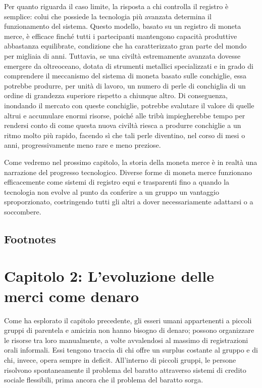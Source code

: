 \documentclass[
  a5paper,
  smalldemyvopaper,10pt,twoside,onecolumn,openright,extrafontsizes,hidelinks]{memoir}
\begin{document}
Per quanto riguarda il caso limite, la risposta a chi controlla il
registro è semplice: colui che possiede la tecnologia più avanzata
determina il funzionamento del sistema. Questo modello, basato su un
registro di moneta merce, è efficace finché tutti i partecipanti
mantengono capacità produttive abbastanza equilibrate, condizione che ha
caratterizzato gran parte del mondo per migliaia di anni. Tuttavia, se
una civiltà estremamente avanzata dovesse emergere da oltreoceano,
dotata di strumenti metallici specializzati e in grado di comprendere il
meccanismo del sistema di moneta basato sulle conchiglie, essa potrebbe
produrre, per unità di lavoro, un numero di perle di conchiglia di un
ordine di grandezza superiore rispetto a chiunque altro. Di conseguenza,
inondando il mercato con queste conchiglie, potrebbe svalutare il valore
di quelle altrui e accumulare enormi risorse, poiché alle tribù
impiegherebbe tempo per rendersi conto di come questa nuova civiltà
riesca a produrre conchiglie a un ritmo molto più rapido, facendo sì che
tali perle diventino, nel corso di mesi o anni, progressivamente meno
rare e meno preziose.

Come vedremo nel prossimo capitolo, la storia della moneta merce è in
realtà una narrazione del progresso tecnologico. Diverse forme di moneta
merce funzionano efficacemente come sistemi di registro equi e
trasparenti fino a quando la tecnologia non evolve al punto da conferire
a un gruppo un vantaggio sproporzionato, costringendo tutti gli altri a
dover necessariamente adattarsi o a soccombere.

\section{Footnotes}\label{footnotes}


\chapter{\texorpdfstring{Capitolo 2: \textbf{L'evoluzione delle merci
come
denaro}}{Capitolo 2: L'evoluzione delle merci come denaro}}\label{capitolo-2-levoluzione-delle-merci-come-denaro}

Come ha esplorato il capitolo precedente, gli esseri umani appartenenti
a piccoli gruppi di parentela e amicizia non hanno bisogno di denaro;
possono organizzare le risorse tra loro manualmente, a volte avvalendosi
al massimo di registrazioni orali informali. Essi tengono traccia di chi
offre un surplus costante al gruppo e di chi, invece, opera sempre in
deficit. All'interno di piccoli gruppi, le persone risolvono
spontaneamente il problema del baratto attraverso sistemi di credito
sociale flessibili, prima ancora che il problema del baratto sorga.
\end{document}

